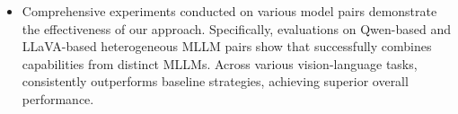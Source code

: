 \begin{itemize}
    \item Comprehensive experiments conducted on various model pairs demonstrate the effectiveness of our approach. Specifically, evaluations on Qwen-based and LLaVA-based heterogeneous MLLM pairs show that \ours successfully combines capabilities from distinct MLLMs. Across various vision-language tasks, \ours consistently outperforms baseline strategies, achieving superior overall performance.

\end{itemize}




